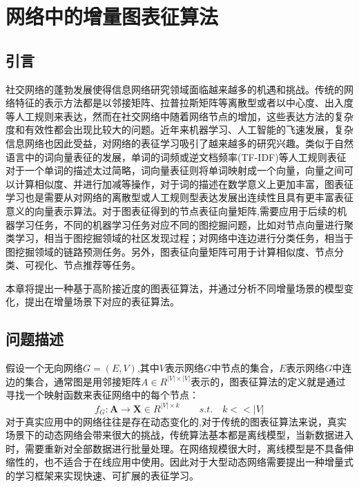 \chapter{网络中的增量图表征算法}
\section{引言}
	社交网络的蓬勃发展使得信息网络研究领域面临越来越多的机遇和挑战。传统的网络特征的表示方法都是以邻接矩阵、拉普拉斯矩阵等离散型或者以中心度、出入度等人工规则来表达，然而在社交网络中随着网络节点的增加，这些表达方法的复杂度和有效性都会出现比较大的问题。近年来机器学习、人工智能的飞速发展，复杂信息网络也因此受益，对网络的表征学习吸引了越来越多的研究兴趣。类似于自然语言中的词向量表征的发展，单词的词频或逆文档频率(TF-IDF)等人工规则表征对于一个单词的描述太过简略，词向量表征则将单词映射成一个向量，向量之间可以计算相似度、并进行加减等操作，对于词的描述在数学意义上更加丰富，图表征学习也是需要从对网络的离散型或人工规则型表达发展出连续性且具有更丰富表征意义的向量表示算法。对于图表征得到的节点表征向量矩阵,需要应用于后续的机器学习任务，不同的机器学习任务对应不同的图挖掘问题，比如对节点向量进行聚类学习，相当于图挖掘领域的社区发现过程；对网络中连边进行分类任务，相当于图挖掘领域的链路预测任务。另外，图表征向量矩阵可用于计算相似度、节点分类、可视化、节点推荐等任务。
	
	本章将提出一种基于高阶接近度的图表征算法，并通过分析不同增量场景的模型变化，提出在增量场景下对应的表征算法。
	
\section{问题描述}
假设一个无向网络$G=(E,V)$,其中$V$表示网络$G$中节点的集合，$E$表示网络$G$中连边的集合，通常图是用邻接矩阵$A \in R^{|V|\times|V|}$表示的，图表征算法的定义就是通过寻找一个映射函数来表征网络中的每个节点：
\begin{equation}
f_G: \textbf{A} \rightarrow \textbf{X} \in R^{|V| \times k} \qquad s.t.\quad k<<|V|
\end{equation}
对于真实应用中的网络往往是存在动态变化的,对于传统的图表征算法来说，真实场景下的动态网络会带来很大的挑战，传统算法基本都是离线模型，当新数据进入时，需要重新对全部数据进行批量处理。在网络规模很大时，离线模型是不具备伸缩性的，也不适合于在线应用中使用。因此对于大型动态网络需要提出一种增量式的学习框架来实现快速、可扩展的表征学习。

